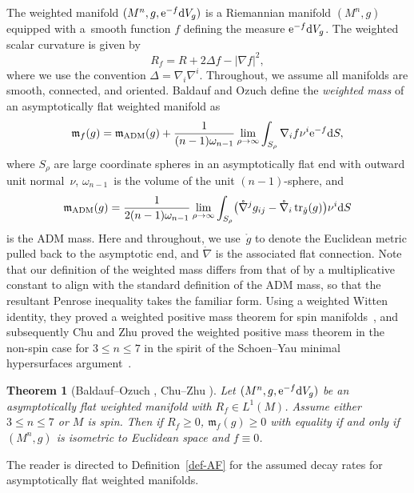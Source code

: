 \documentclass[10pt,a4paper]{amsart}
\numberwithin{equation}{section}
\newtheorem{Theorem}{Theorem}[section]
\theoremstyle{definition}
\begin{document}
The weighted manifold $(M^n,g,{\rm e}^{-f}{\rm d}V_g)$ is a Riemannian manifold $(M^n,g)$ equipped with a~smooth function $f$ defining the measure ${\rm e}^{-f}{\rm d}V_g$. The weighted scalar curvature is given by
\[
	R_f = R + 2\Delta f - |\nabla f|^2,
\]
where we use the convention $\Delta=\nabla_i \nabla^i$. Throughout, we assume all manifolds are smooth, connected, and oriented. Baldauf and Ozuch define the \emph{weighted mass} of an asymptotically flat weighted manifold as
\begin{equation*}%
	\mathfrak{m}_f(g) = \mathfrak{m}_{\rm ADM}(g)  +  \frac{1}{(n-1) \omega_{n-1}}\lim_{\rho\to\infty}\int_{S_\rho} \nabla_i f \nu^i {\rm e}^{-f} {\rm d}S,
\end{equation*}
where $S_\rho$ are large coordinate spheres in an asymptotically flat end with outward unit normal~$\nu$, $\omega_{n-1}$~is the volume of the unit $(n-1)$-sphere, and
\begin{equation*}%
	\mathfrak{m}_{\rm ADM}(g)=\frac{1}{2(n-1) \omega_{n-1}}\lim_{\rho\to\infty}\int_{S_\rho} \bigl( \mathring{\nabla}^jg_{ij}-\mathring{\nabla}_i\operatorname{tr}_{\mathring g}(g)\bigr) \nu^i{\rm d}S
\end{equation*}
is the ADM mass. Here and throughout, we use~$\mathring g$ to denote the Euclidean metric pulled back to the asymptotic end, and $\mathring\nabla$ is the associated flat connection. Note that our definition of the weighted mass differs from that of \cite{BaldaufOzuch22} by a multiplicative constant to align with the standard definition of the ADM mass, so that the resultant Penrose inequality takes the familiar form. Using a weighted Witten identity, they proved a weighted positive mass theorem for spin manifolds~\cite{BaldaufOzuch22}, and subsequently Chu and Zhu proved the weighted positive mass theorem in the non-spin case for $3\le n\le 7$ in the spirit of the Schoen--Yau minimal hypersurfaces argument~\cite{ChuZhu24}.

\begin{Theorem}[Baldauf--Ozuch \cite{BaldaufOzuch22}, Chu--Zhu \cite{ChuZhu24}]\label{thm-BO-CZ}
	Let $(M^n,g,{\rm e}^{-f}{\rm d}V_g)$ be an asymptotically flat weighted manifold with $R_f\in L^1(M)$. Assume either $3\le n\le 7$ or $M$ is spin.
Then if $R_f\ge 0$, $\mathfrak{m}_f(g)\ge 0$ with equality if and only if $(M^n,g)$ is isometric to Euclidean space and $f\equiv0$.
\end{Theorem}
The reader is directed to Definition~\ref{def-AF} for the assumed decay rates for asymptotically flat weighted manifolds.
\end{document}
